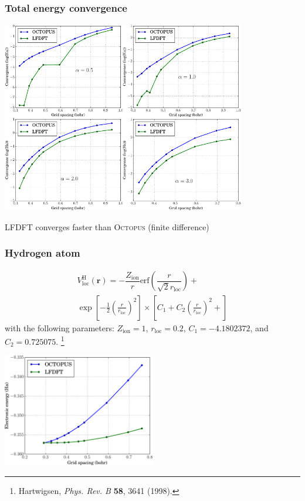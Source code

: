 \documentclass[10pt,t]{beamer}
\begin{document}
\begin{frame}
\frametitle{Total energy convergence}

{\centering
\includegraphics[width=0.8\textwidth]{images/COMBINE_v1.pdf}
\par
LFDFT converges faster than \textsc{Octopus} (finite difference)
\par}

\end{frame}



\begin{frame}
\frametitle{Hydrogen atom}

\begin{multline}
  V^{\mathrm{H}}_{\mathrm{loc}}(\mathbf{r}) = 
  -\dfrac{Z_{\mathrm{ion}}}{r}
  \mathrm{erf}\left(
  \dfrac{r}{\sqrt{2}r_{\mathrm{loc}}}
  \right) + \\
  \exp
  \left[ -\frac{1}{2}
  \left( \frac{r}{r_{\mathrm{loc}}}\right)^2
  \right]
  \times
  \left[
  C_{1} +
  C_{2}\left( \frac{r}{r_{\mathrm{loc}}}\right)^2 +
\right]
\end{multline}
with the following parameters:
$Z_{\mathrm{ion}} = 1$, $r_{\mathrm{loc}} = 0.2$,
$C_{1} = -4.1802372$, and $C_{2} = 0.725075$.
\footnote{
  Hartwigsen, \textit{Phys. Rev. B}  \textbf{58}, 3641 (1998). 
}

\end{frame}

\begin{frame}[plain]
  
{\centering
\includegraphics[width=0.5\textwidth]{images/atom_H.pdf}
}
  
\end{frame}
\end{document}
